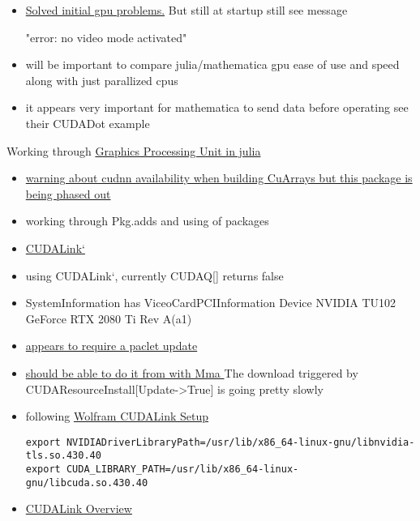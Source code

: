 \documentclass[hyperref]{labbook}
\begin{document}


\begin{itemize}
\item 
\href{https://ubuntu-mate.community/t/grub-terminal-console-mode-error/7356/8}{Solved initial gpu problems.}  But still at startup still see message

"error: no  video mode activated"
\item will be important to compare julia/mathematica gpu ease of use and speed along with just parallized cpus
\item it appears very important for mathematica to send data  before operating see their CUDADot example
\end{itemize}

Working through
\href{https://nextjournal.com/sdanisch/julia-gpu-programming}{Graphics Processing Unit in julia}

\begin{itemize}
\item  \href{https://github.com/JuliaAttic/CUDNN.jl}{warning about cudnn availability when building CuArrays but this package is being phased out}
\item working through Pkg.adds and using of packages
\end{itemize}



\begin{itemize}
\item \href{https://reference.wolfram.com/language/CUDALink/guide/CUDALink.html}{CUDALink`}
\item using CUDALink`, currently CUDAQ[] returns false
\item SystemInformation has ViceoCardPCIInformation Device NVIDIA TU102 GeForce RTX 2080 Ti Rev A(a1)
\item \href{https://mathematica.stackexchange.com/questions/195348/mathematica-12-supported-gpus}{appears to require a paclet update}
\item \href{http://support.wolfram.com/kb/12498}{should be able to do it from with Mma }  The download triggered by CUDAResourceInstall[Update->True]  is going pretty slowly
\item following \href{https://reference.wolfram.com/language/CUDALink/tutorial/Setup.html}{Wolfram CUDALink Setup}
\begin{verbatim}
export NVIDIADriverLibraryPath=/usr/lib/x86_64-linux-gnu/libnvidia-tls.so.430.40
export CUDA_LIBRARY_PATH=/usr/lib/x86_64-linux-gnu/libcuda.so.430.40
\end{verbatim}
\item \href{https://reference.wolfram.com/language/CUDALink/tutorial/Overview.html}{CUDALink Overview}
\end{itemize}
\end{document}
